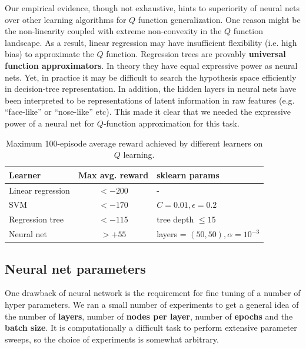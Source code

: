 \documentclass[conference]{IEEEtran}
\begin{document}
Our empirical evidence, though not exhaustive, hints to superiority of neural nets over other learning algorithms for $Q$ function generalization. One reason might be the non-linearity coupled with extreme non-convexity in the $Q$ function landscape. As a result, linear regression may have insufficient flexibility (i.e. high bias) to approximate the $Q$ function. Regression trees are provably {\bf universal function approximators}. In theory they have equal expressive power as neural nets. Yet, in practice it may be difficult to search the hypothesis space efficiently in decision-tree representation. In addition, the hidden layers in neural nets have been interpreted to be representations of latent information in raw features (e.g. ``face-like'' or ``nose-like'' etc). This made it clear that we needed the expressive power of a neural net for $Q$-function approximation for this task.
\begin{table}[bpht]
\begin{center}
\begin{tabular}{|l|c|l|}
\hline
Learner & Max avg. reward & sklearn params \\ \hline 
Linear regression & $<-200$ & -\\
SVM & $<-170$ & $C=0.01, \epsilon=0.2$ \\
Regression tree &$<-115$ & tree depth $\leq 15$ \\
Neural net & $> +55 $ & layers = $(50, 50), \alpha =10^{-3} $ \\ \hline
\end{tabular}
\end{center}
\caption{Maximum 100-episode average reward achieved by different learners on $Q$ learning. \label{tab:learners}}
\end{table}
\subsection{Neural net parameters}
One drawback of neural network is the requirement for fine tuning of a number of hyper parameters. We ran a small number of experiments to get a general idea of the number of {\bf layers}, number of {\bf nodes per layer}, number of {\bf epochs} and the {\bf batch size}. It is computationally a difficult task to perform extensive parameter sweeps, so the choice of experiments is somewhat arbitrary. 
\end{document}
